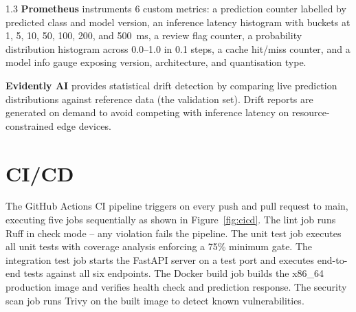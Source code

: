 \begin{spacing}{1.3}
\textbf{Prometheus} instruments 6 custom metrics: a prediction counter labelled by predicted class and model version, an inference latency histogram with buckets at 1, 5, 10, 50, 100, 200, and 500~ms, a review flag counter, a probability distribution histogram across 0.0--1.0 in 0.1 steps, a cache hit/miss counter, and a model info gauge exposing version, architecture, and quantisation type.

\textbf{Evidently AI} provides statistical drift detection by comparing live prediction distributions against reference data (the validation set). Drift reports are generated on demand to avoid competing with inference latency on resource-constrained edge devices.

\section{CI/CD}

The GitHub Actions CI pipeline triggers on every push and pull request to main, executing five jobs sequentially as shown in Figure~\ref{fig:cicd}. The lint job runs Ruff in check mode -- any violation fails the pipeline. The unit test job executes all unit tests with coverage analysis enforcing a 75\% minimum gate. The integration test job starts the FastAPI server on a test port and executes end-to-end tests against all six endpoints. The Docker build job builds the x86\_64 production image and verifies health check and prediction response. The security scan job runs Trivy on the built image to detect known vulnerabilities.

\begin{figure}[H]
\centering
{}
\end{figure}
\end{spacing}
